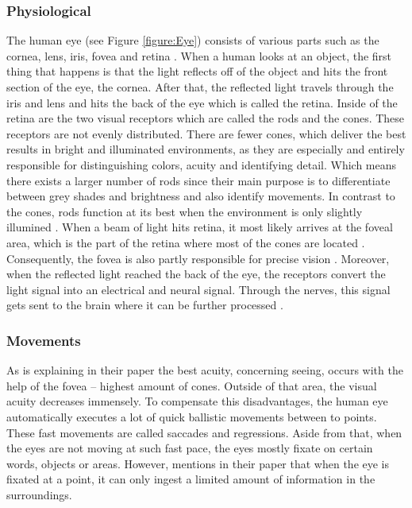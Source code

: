 \subsubsection{Physiological}
The human eye (see Figure \ref{figure:Eye}) consists of various parts such as the cornea, lens, iris, fovea and retina \autocite{djamasbi2014eye}. When a human looks at an object, the first thing that happens is that the light reflects off of the object and hits the front section of the eye, the cornea. After that, the reflected light travels through the iris and lens and hits the back of the eye which is called the retina. Inside of the retina are the two visual receptors which are called the rods and the cones. These receptors are not evenly distributed. There are fewer cones, which deliver the best results in bright and illuminated environments, as they are especially and entirely responsible for distinguishing colors, acuity and identifying detail. Which means there exists a larger number of rods since their main purpose is to differentiate between grey shades and brightness and also identify movements. In contrast to the cones, rods function at its best when the environment is only slightly illumined \autocite{djamasbi2014eye, biedert2010eyebook}.
When a beam of light hits retina, it most likely arrives at the foveal area, which is the part of the retina where most of the cones are located \autocite{djamasbi2014eye}. Consequently, the fovea is also partly responsible for precise vision \autocite{biedert2010eyebook}.
Moreover, when the reflected light reached the back of the eye, the receptors convert the light signal into an electrical and neural signal. Through the nerves, this signal gets sent to the brain where it can be further processed \autocite{djamasbi2014eye}.

\subsubsection{Movements}
As \textcite{djamasbi2014eye} is explaining in their paper the best acuity, concerning seeing, occurs with the help of the fovea -- highest amount of cones. Outside of that area, the visual acuity decreases immensely. To compensate this disadvantages, the human eye automatically executes a lot of quick ballistic movements between to points. These fast movements are called saccades and regressions.
Aside from that, when the eyes are not moving at such fast pace, the eyes mostly fixate on certain words, objects or areas.  However, \textcite{biedert2010eyebook} mentions in their paper that when the eye is fixated at a point, it can only ingest a limited amount of information in the surroundings.

